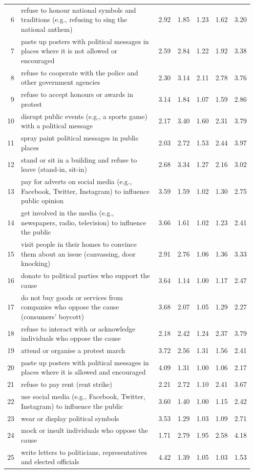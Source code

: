 \documentclass[12pt, letterpaper]{article}
\begin{document}
\begin{xltabular}{\linewidth}{rXrrrrr}
6 & refuse to honour national symbols and traditions (e.g., refusing to sing the national anthem) & 2.92 & 1.85 & 1.23 & 1.62 & 3.20\\
7 & paste up posters with political messages in places where it is not allowed or encouraged & 2.59 & 2.84 & 1.22 & 1.92 & 3.38\\
8 & refuse to cooperate with the police and other government agencies & 2.30 & 3.14 & 2.11 & 2.78 & 3.76\\
9 & refuse to accept honours or awards in protest & 3.14 & 1.84 & 1.07 & 1.59 & 2.86\\
10 & disrupt public events (e.g., a sports game) with a political message & 2.17 & 3.40 & 1.60 & 2.31 & 3.79\\

11 & spray paint political messages in public places & 2.03 & 2.72 & 1.53 & 2.44 & 3.97\\
12 & stand or sit in a building and refuse to leave (stand-in, sit-in) & 2.68 & 3.34 & 1.27 & 2.16 & 3.02\\
13 & pay for adverts on social media (e.g., Facebook, Twitter, Instagram) to influence public opinion & 3.59 & 1.59 & 1.02 & 1.30 & 2.75\\
14 & get involved in the media (e.g., newspapers, radio, television) to influence the public & 3.66 & 1.61 & 1.02 & 1.23 & 2.41\\
15 & visit people in their homes to convince them about an issue (canvassing, door knocking) & 2.91 & 2.76 & 1.06 & 1.36 & 3.33\\

16 & donate to political parties who support the cause & 3.64 & 1.14 & 1.00 & 1.17 & 2.47\\
17 & do not buy goods or services from companies who oppose the cause (consumers' boycott) & 3.68 & 2.07 & 1.05 & 1.29 & 2.27\\
18 & refuse to interact with or acknowledge individuals who oppose the cause & 2.18 & 2.42 & 1.24 & 2.37 & 3.79\\
19 & attend or organise a protest march & 3.72 & 2.56 & 1.31 & 1.56 & 2.41\\
20 & paste up posters with political messages in places where it is allowed and encouraged & 4.09 & 1.31 & 1.00 & 1.06 & 2.17\\

21 & refuse to pay rent (rent strike) & 2.21 & 2.72 & 1.10 & 2.41 & 3.67\\
22 & use social media (e.g., Facebook, Twitter, Instagram) to influence the public & 3.60 & 1.40 & 1.00 & 1.15 & 2.42\\
23 & wear or display political symbols & 3.53 & 1.29 & 1.03 & 1.09 & 2.71\\
24 & mock or insult individuals who oppose the cause & 1.71 & 2.79 & 1.95 & 2.58 & 4.18\\
25 & write letters to politicians, representatives and elected officials & 4.42 & 1.39 & 1.05 & 1.03 & 1.53\\


\end{xltabular}
\end{document}
